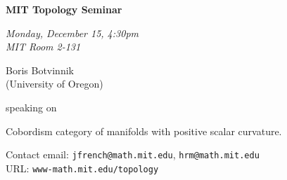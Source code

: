\message{ !name(poserboris08.tex)}\documentclass{slides}
\begin{document}


\begin{center}

{\fontsize {54pt}{40pt}\selectfont

\textrm{
{\textbf{MIT Topology Seminar}}}
}
\medskip


{\large\textrm{\emph{Monday, December 15, 4:30pm\\MIT Room 2-131}}}



\bigskip

\textrm{{\LARGE Boris Botvinnik  \\[.5cm](University of Oregon)}}

\bigskip\bigskip\bigskip
\textrm{speaking on}
\bigskip\bigskip\bigskip

\textrm{\LARGE Cobordism category of manifolds with positive scalar curvature. }\\

\end{center}

\vspace{1cm}

{\small
\textrm{Contact email: } \texttt{jfrench@math.mit.edu}, \texttt{hrm@math.mit.edu}\\
\textrm{URL: } \texttt{www-math.mit.edu/topology}
}
\end{document}
